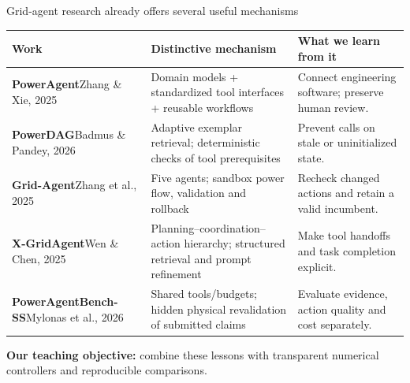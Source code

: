 
\begin{frame}[t]{Grid-agent research already offers several useful mechanisms}
\begingroup
\fontsize{8.7}{10.4}\selectfont
\renewcommand{\arraystretch}{1.35}
\begin{tabular}{@{}>{\raggedright\arraybackslash}p{.21\linewidth}>{\raggedright\arraybackslash}p{.44\linewidth}>{\raggedright\arraybackslash}p{.29\linewidth}@{}}
\toprule Work & Distinctive mechanism & What we learn from it \\
\midrule
\textbf{PowerAgent}\newline Zhang \& Xie, 2025
& Domain models + standardized tool interfaces + reusable workflows
& Connect engineering software; preserve human review. \\
\textbf{PowerDAG}\newline Badmus \& Pandey, 2026
& Adaptive exemplar retrieval; deterministic checks of tool prerequisites
& Prevent calls on stale or uninitialized state. \\
\textbf{Grid-Agent}\newline Zhang et al., 2025
& Five agents; sandbox power flow, validation and rollback
& Recheck changed actions and retain a valid incumbent. \\
\textbf{X-GridAgent}\newline Wen \& Chen, 2025
& Planning--coordination--action hierarchy; structured retrieval and prompt refinement
& Make tool handoffs and task completion explicit. \\
\textbf{PowerAgentBench-SS}\newline Mylonas et al., 2026
& Shared tools/budgets; hidden physical revalidation of submitted claims
& Evaluate evidence, action quality and cost separately. \\
\bottomrule
\end{tabular}
\par\medskip
\textbf{Our teaching objective:} combine these lessons with transparent numerical controllers and reproducible comparisons.
\endgroup
{}

\end{frame}
